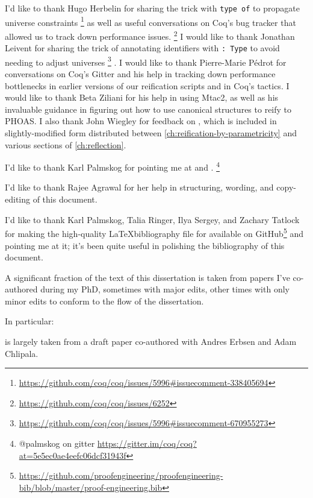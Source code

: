 I'd like to thank Hugo Herbelin for sharing the trick with \texttt{type of} to propagate universe constraints%
\footnote{%
    \url{https://github.com/coq/coq/issues/5996\#issuecomment-338405694}%
}
as well as useful conversations on Coq's bug tracker that allowed us to track down performance issues.%
\footnote{%
    \url{https://github.com/coq/coq/issues/6252}%
}
I would like to thank Jonathan Leivent for sharing the trick of annotating identifiers with \texttt{: Type} to avoid needing to adjust universes%
\footnote{%
  \url{https://github.com/coq/coq/issues/5996\#issuecomment-670955273}
}%
.
I would like to thank Pierre-Marie Pédrot for conversations on Coq's Gitter and his help in tracking down performance bottlenecks in earlier versions of our reification scripts and in Coq's tactics.
I would like to thank Beta Ziliani for his help in using Mtac2, as well as his invaluable guidance in figuring out how to use canonical structures to reify to PHOAS.
I also thank John Wiegley for feedback on , which is included in slightly-modified form distributed between \autoref{ch:reification-by-parametricity} and various sections of \autoref{ch:reflection}.

I'd like to thank Karl Palmskog for pointing me at \textcite{Should1999Lamport} and \textcite{Formalising2018Paulson}.%
\footnote{@palmskog on gitter \url{https://gitter.im/coq/coq?at=5e5ec0ae4eefc06dcf31943f}}


I'd like to thank Rajee Agrawal for her help in structuring, wording, and copy-editing of this document.

I'd like to thank Karl Palmskog, Talia Ringer, Ilya Sergey, and Zachary Tatlock for making the high-quality \LaTeX\space bibliography file for  available on GitHub\footnote{\url{https://github.com/proofengineering/proofengineering-bib/blob/master/proof-engineering.bib}} and pointing me at it; it's been quite useful in polishing the bibliography of this document.

A significant fraction of the text of this dissertation is taken from papers I've co-authored during my PhD, sometimes with major edits, other times with only minor edits to conform to the flow of the dissertation.

In particular:

 is largely taken from a draft paper co-authored with Andres Erbsen and Adam Chlipala.

